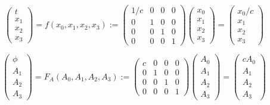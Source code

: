 \documentclass{article}
\begin{document}
\begin{equation} \label{coordinateTransformClassical}
\left(\begin{array}{c}
          t
          \\
          x_1
          \\
          x_2
          \\
          x_3
\end{array} \right)
= f(x_0,x_1,x_2,x_3)
:=
\begin{pmatrix}
    1/c & 0 & 0 & 0
    \\
    0 & 1 & 0 & 0
    \\
    0 & 0 & 1 & 0
    \\
    0 & 0 & 0 & 1
\end{pmatrix}
\left(\begin{array}{c}
          x_0
          \\
          x_1
          \\
          x_2
          \\
          x_3
\end{array} \right)
=
\left(\begin{array}{c}
          x_0/c
          \\
          x_1
          \\
          x_2
          \\
          x_3
\end{array} \right)
\end{equation}


\begin{equation} \label{fieldTransformClassical}
    \left(\begin{array}{c}
              \phi
              \\
              A_1
              \\
              A_2
              \\
              A_3
    \end{array} \right)
    = F_A(A_0,A_1,A_2,A_3)
    :=
    \begin{pmatrix}
        c & 0 & 0 & 0
        \\
        0 & 1 & 0 & 0
        \\
        0 & 0 & 1 & 0
        \\
        0 & 0 & 0 & 1
    \end{pmatrix}
    \left(\begin{array}{c}
              A_0
              \\
              A_1
              \\
              A_2
              \\
              A_3
    \end{array} \right)
    =
    \left(\begin{array}{c}
              c A_0
              \\
              A_1
              \\
              A_2
              \\
              A_3
    \end{array} \right)
\end{equation}
\end{document}
